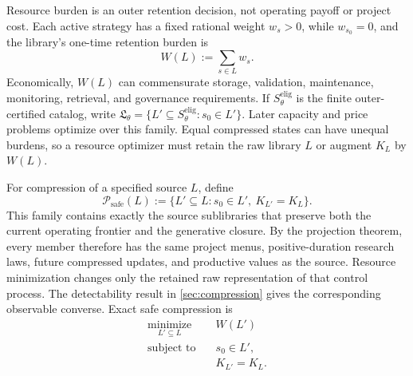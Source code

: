 Resource burden is an outer retention decision, not operating payoff or
project cost.  Each active strategy has a fixed rational weight \(w_s>0\),
while \(w_{s_0}=0\), and the library's one-time retention burden is
\begin{equation}\label{eq:library-burden}
  W(L):=\sum_{s\in L}w_s.
\end{equation}
Economically, \(W(L)\) can commensurate storage, validation, maintenance,
monitoring, retrieval, and governance requirements.  If
\(S_\theta^{\mathrm{elig}}\) is the finite outer-certified catalog, write
\(\mathfrak L_\theta=\{L'\subseteq S_\theta^{\mathrm{elig}}:s_0\in L'\}\).
Later capacity and price problems optimize over this family.  Equal compressed
states can have unequal burdens, so a resource optimizer must retain the raw
library \(L\) or augment \(K_L\) by \(W(L)\).

For compression of a specified source \(L\), define
\begin{equation}\label{eq:safe-compression-family}
  \mathcal P_{\mathrm{safe}}(L)
  :=\{L'\subseteq L:s_0\in L',\ K_{L'}=K_L\}.
\end{equation}
This family contains exactly the source sublibraries that preserve both the
current operating frontier and the generative closure.  By the projection
theorem, every member therefore has the same project menus,
positive-duration research laws, future compressed updates, and productive
values as the source.  Resource minimization changes only the retained raw
representation of that control process.  The detectability result in
\cref{sec:compression} gives the corresponding observable converse.  Exact
safe compression is
\begin{equation}\label{eq:minimum-safe-compression}
  \boxed{
  \begin{aligned}
    \underset{L'\subseteq L}{\operatorname{minimize}}\quad &W(L')\\
    \text{subject to}\quad &s_0\in L',\\
                            &K_{L'}=K_L.
  \end{aligned}}
\end{equation}
